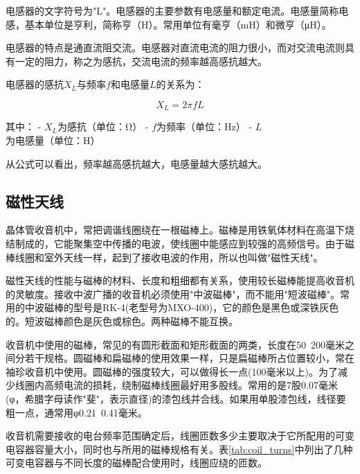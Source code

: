 \documentclass[12pt,UTF8]{ctexbook}
\begin{document}
电感器的文字符号为"L"。电感器的主要参数有电感量和额定电流。电感量简称电感，基本单位是亨利，简称亨（H）。常用单位有毫亨（mH）和微亨（μH）。

电感器的特点是通直流阻交流。电感器对直流电流的阻力很小，而对交流电流则具有一定的阻力，称之为感抗，交流电流的频率越高感抗越大。

电感器的感抗$X_L$与频率$f$和电感量$L$的关系为：

\[ X_L = 2\pi f L \]

其中：
- $X_L$为感抗（单位：Ω）
- $f$为频率（单位：Hz）
- $L$为电感量（单位：H）

从公式可以看出，频率越高感抗越大，电感量越大感抗越大。

\subsection{磁性天线}

晶体管收音机中，常把调谐线圈绕在一根磁棒上。磁棒是用铁氧体材料在高温下烧结制成的，它能聚集空中传播的电波，使线圈中能感应到较强的高频信号。由于磁棒线圈和室外天线一样，起到了接收电波的作用，所以也叫做"磁性天线"。

磁性天线的性能与磁棒的材料、长度和粗细都有关系，使用较长磁棒能提高收音机的灵敏度。接收中波广播的收音机必须使用"中波磁棒"，而不能用"短波磁棒"。常用的中波磁棒的型号是RK-4(老型号为MXO-400)，它的颜色是黑色或深铁灰色的。短波磁棒颜色是灰色或棕色。两种磁棒不能互换。

收音机中使用的磁棒，常见的有圆形截面和矩形截面的两类，长度在50~200毫米之间分若干规格。圆磁棒和扁磁棒的使用效果一样，只是扁磁棒所占位置较小，常在袖珍收音机中使用。圆磁棒的强度较大，可以做得长一点(100毫米以上)。为了减少线圈内高频电流的损耗，绕制磁棒线圈最好用多股线。常用的是7股0.07毫米(φ，希腊字母读作"斐"，表示直径)的漆包线并合线。如果用单股漆包线，线径要粗一点，通常用φ0.21~0.41毫米。

收音机需要接收的电台频率范围确定后，线圈匝数多少主要取决于它所配用的可变电容器容量大小，同时也与所用的磁棒规格有关。表\ref{tab:coil_turns}中列出了几种可变电容器与不同长度的磁棒配合使用时，线圈应绕的匝数。
\end{document}
